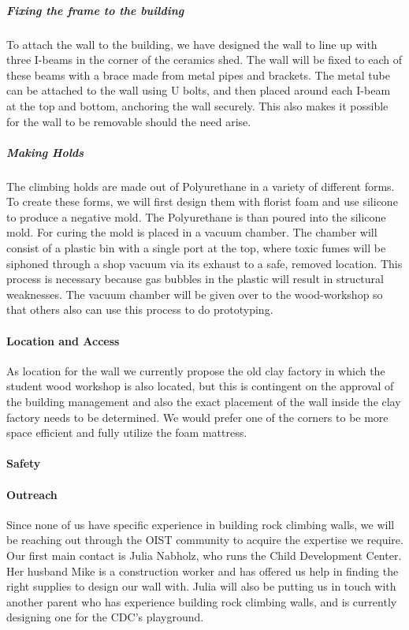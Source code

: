 \documentclass[a4paper, 12pt]{scrartcl}
\begin{document}
\subparagraph{Fixing the frame to the building}
To attach the wall to the building, we have designed the wall to line up with three I-beams in the corner of the ceramics shed. The wall will be fixed to each of these beams with a brace made from metal pipes and brackets. The metal tube can be attached to the wall using U bolts, and then placed around each I-beam at the top and bottom, anchoring the wall securely. This also makes it possible for the wall to be removable should the need arise.

\subparagraph{Making Holds}
The climbing holds are made out of Polyurethane in a variety of different forms. To create these forms, we will first design them with florist foam and use silicone to produce a negative mold. The Polyurethane is than poured into the silicone mold. For curing the mold is placed in a vacuum chamber. The chamber will consist of a plastic bin with a single port at the top, where toxic fumes will be siphoned through a shop vacuum via its exhaust to a safe, removed location. This process is necessary because gas bubbles in the plastic will result in structural weaknesses. The vacuum chamber will be given over to the wood-workshop so that others also can use this process to do prototyping.


\paragraph{Location and Access}
As location for the wall we currently propose the old clay factory in which the student wood workshop is also located, but this is contingent on the approval of the building management and also the exact placement of the wall inside the clay factory needs to be determined. We would prefer one of the corners to be more space efficient and fully utilize the foam mattress.

\paragraph{Safety}


\paragraph{Outreach}
Since none of us have specific experience in building rock climbing walls, we will be reaching out through the OIST community to acquire the expertise we require. Our first main contact is Julia Nabholz, who runs the Child Development Center. Her husband Mike is a construction worker and has offered us help in finding the right supplies to design our wall with. Julia will also be putting us in touch with another parent who has experience building rock climbing walls, and is currently designing one for the CDC's playground.
\end{document}

